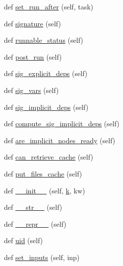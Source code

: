 \begin{DoxyCompactItemize}
\item 
def \hyperlink{classwaflib_1_1_task_1_1_task_a84292828c5a6cf3282027ed8ce5c7822}{set\+\_\+run\+\_\+after} (self, task)
\item 
def \hyperlink{classwaflib_1_1_task_1_1_task_a48e55f13de8172b779a4e63794c7f44f}{signature} (self)
\item 
def \hyperlink{classwaflib_1_1_task_1_1_task_a2a281aaea77a0732f72103cfe4bc56c4}{runnable\+\_\+status} (self)
\item 
def \hyperlink{classwaflib_1_1_task_1_1_task_ac7c2e0bf22acd7d96399b1ca7f342232}{post\+\_\+run} (self)
\item 
def \hyperlink{classwaflib_1_1_task_1_1_task_a76a53025fb59fd6096f988ff64481070}{sig\+\_\+explicit\+\_\+deps} (self)
\item 
def \hyperlink{classwaflib_1_1_task_1_1_task_acffd01af005b390787b85239ac207282}{sig\+\_\+vars} (self)
\item 
def \hyperlink{classwaflib_1_1_task_1_1_task_a60ce159ef323481b09fcea4decb9e231}{sig\+\_\+implicit\+\_\+deps} (self)
\item 
def \hyperlink{classwaflib_1_1_task_1_1_task_adf3f63ea77fbca592ebc4244ba57887d}{compute\+\_\+sig\+\_\+implicit\+\_\+deps} (self)
\item 
def \hyperlink{classwaflib_1_1_task_1_1_task_a89612661d2073f53f62d7306a6c2238d}{are\+\_\+implicit\+\_\+nodes\+\_\+ready} (self)
\item 
def \hyperlink{classwaflib_1_1_task_1_1_task_a2085cfed25d49bed519af381621b29e7}{can\+\_\+retrieve\+\_\+cache} (self)
\item 
def \hyperlink{classwaflib_1_1_task_1_1_task_adf5e108580503738b2ab58eb1b56c10f}{put\+\_\+files\+\_\+cache} (self)
\item 
def \hyperlink{classwaflib_1_1_task_1_1_task_a566ab609bec4499aeab7bcd6f77f156e}{\+\_\+\+\_\+init\+\_\+\+\_\+} (self, \hyperlink{rfft2d_test_m_l_8m_adc468c70fb574ebd07287b38d0d0676d}{k}, kw)
\item 
def \hyperlink{classwaflib_1_1_task_1_1_task_a2507ae71718d699910a9dd8708664630}{\+\_\+\+\_\+str\+\_\+\+\_\+} (self)
\item 
def \hyperlink{classwaflib_1_1_task_1_1_task_ac05a045661750df307593224089759da}{\+\_\+\+\_\+repr\+\_\+\+\_\+} (self)
\item 
def \hyperlink{classwaflib_1_1_task_1_1_task_a910c51ea67c1c47ac40690bbba73b76a}{uid} (self)
\item 
def \hyperlink{classwaflib_1_1_task_1_1_task_a647c971bbca84d07daeff8d24f70ea18}{set\+\_\+inputs} (self, inp)

\end{DoxyCompactItemize}
